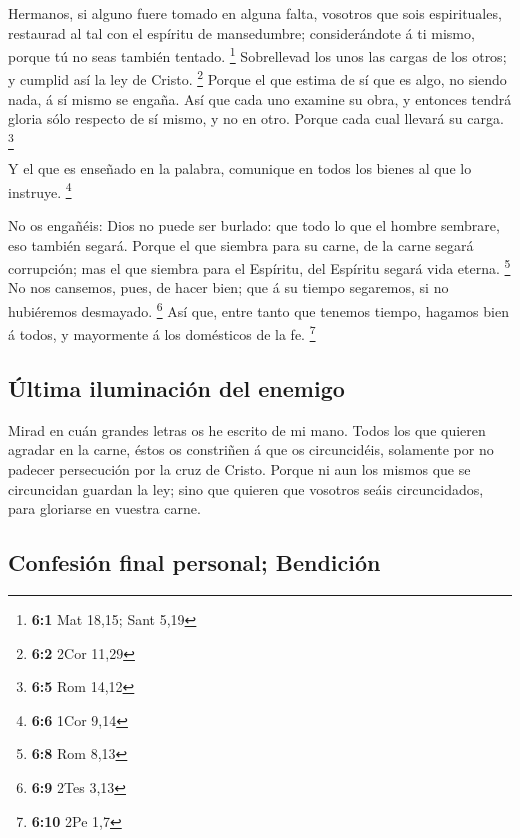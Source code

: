  Hermanos, si alguno fuere tomado en alguna falta, vosotros
que sois espirituales, restaurad al tal con el espíritu de mansedumbre;
considerándote á ti mismo, porque tú no seas también tentado.
\footnote{\textbf{6:1} Mat 18,15; Sant 5,19}  Sobrellevad
los unos las cargas de los otros; y cumplid así la ley de Cristo.
\footnote{\textbf{6:2} 2Cor 11,29}  Porque el que estima de
sí que es algo, no siendo nada, á sí mismo se engaña.  Así
que cada uno examine su obra, y entonces tendrá gloria sólo respecto de
sí mismo, y no en otro.  Porque cada cual llevará su carga.
\footnote{\textbf{6:5} Rom 14,12}

 Y el que es enseñado en la palabra, comunique en todos los
bienes al que lo instruye. \footnote{\textbf{6:6} 1Cor 9,14}

 No os engañéis: Dios no puede ser burlado: que todo lo que
el hombre sembrare, eso también segará.  Porque el que
siembra para su carne, de la carne segará corrupción; mas el que siembra
para el Espíritu, del Espíritu segará vida eterna. \footnote{\textbf{6:8}
  Rom 8,13}  No nos cansemos, pues, de hacer bien; que á su
tiempo segaremos, si no hubiéremos desmayado. \footnote{\textbf{6:9}
  2Tes 3,13}  Así que, entre tanto que tenemos tiempo,
hagamos bien á todos, y mayormente á los domésticos de la fe.
\footnote{\textbf{6:10} 2Pe 1,7}

\hypertarget{uxfaltima-iluminaciuxf3n-del-enemigo}{%
\subsection{Última iluminación del
enemigo}\label{uxfaltima-iluminaciuxf3n-del-enemigo}}

 Mirad en cuán grandes letras os he escrito de mi mano.
 Todos los que quieren agradar en la carne, éstos os
constriñen á que os circuncidéis, solamente por no padecer persecución
por la cruz de Cristo.  Porque ni aun los mismos que se
circuncidan guardan la ley; sino que quieren que vosotros seáis
circuncidados, para gloriarse en vuestra carne.

\hypertarget{confesiuxf3n-final-personal-bendiciuxf3n}{%
\subsection{Confesión final personal;
Bendición}\label{confesiuxf3n-final-personal-bendiciuxf3n}}


